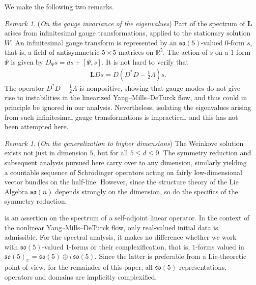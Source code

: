 \documentclass[11pt,reqno]{amsart}
\theoremstyle{remark}
\newtheorem{remark}[theorem]{Remark}
\theoremstyle{definition}
\newcommand{\sov}{\mathfrak{so}(5)}
\begin{document}
We make the following two remarks.
\begin{remark}(\emph{On the gauge invariance of the eigenvalues})
Part of the spectrum of $\mathbf L$ arises from infinitesimal gauge transformations, applied to the stationary solution $W$. An infinitesimal gauge transform is represented by an $\sov$-valued $0$-form $s$, that is, a field of antisymmetric $5 \times 5$ matrices on $\mathbb R^5$. The action of $s$ on a $1$-form $\Psi$ is given by $D_\Psi s = d s + [\Psi,s]$. It is not hard to verify that
\begin{align*}
    \mathbf L D s = D (D^\ast D - \frac12 \Lambda) s.
\end{align*}
The operator $D^\ast D - \frac12 \Lambda$ is nonpositive, showing that gauge modes do not give rise to instabilities in the linearized Yang--Mills--DeTurck flow, and thus could in principle be ignored in our analysis. Nevertheless, isolating the eigenvalues arising from such infinitesimal gauge transformations is impractical, and this has not been attempted here.
\end{remark}
\begin{remark}(\emph{On the generalization to higher dimensions})
The Weinkove solution exists not just in dimension $5$, but for all $5\leq d\leq 9$. The symmetry reduction and subsequent analysis pursued here carry over to any dimension, similarly yielding a countable sequence of Schrödinger operators acting on fairly low-dimensional vector bundles on the half-line. However, since the structure theory of the Lie Algebra $\mathfrak{so}(n)$ depends strongly on the dimension, so do the specifics of the symmetry reduction.
\end{remark}

 is an assertion on the spectrum of a self-adjoint linear operator. In the context of the nonlinear Yang--Mills--DeTurck flow, only real-valued initial data is admissible. For the spectral analysis, it makes no difference whether we work with  $\sov$-valued $1$-forms or their complexification, that is, $1$-forms valued in $\mathfrak{so}(5)_{\mathbb C} = \mathfrak{so}(5) \oplus i \, \mathfrak{so}(5)$. Since the latter is preferable from a Lie-theoretic point of view, for the remainder of this paper, all $\sov$-representations, operators and domains are implicitly complexified.
\end{document}
